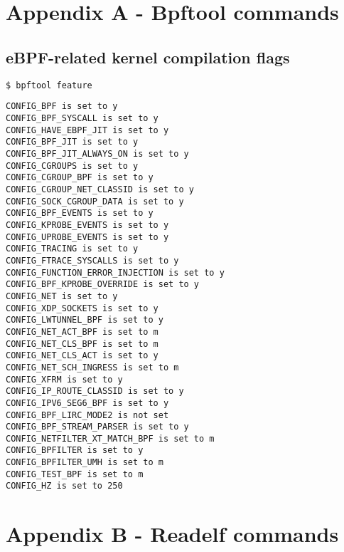 
%



\chapter* {Appendix A - Bpftool commands} \label{annex:bpftool_flags_kernel}
\section*{eBPF-related kernel compilation flags} 
\begin{lstlisting}[language=bash]
$ bpftool feature
\end{lstlisting}

\begin{verbatim}
CONFIG_BPF is set to y
CONFIG_BPF_SYSCALL is set to y
CONFIG_HAVE_EBPF_JIT is set to y
CONFIG_BPF_JIT is set to y
CONFIG_BPF_JIT_ALWAYS_ON is set to y
CONFIG_CGROUPS is set to y
CONFIG_CGROUP_BPF is set to y
CONFIG_CGROUP_NET_CLASSID is set to y
CONFIG_SOCK_CGROUP_DATA is set to y
CONFIG_BPF_EVENTS is set to y
CONFIG_KPROBE_EVENTS is set to y
CONFIG_UPROBE_EVENTS is set to y
CONFIG_TRACING is set to y
CONFIG_FTRACE_SYSCALLS is set to y
CONFIG_FUNCTION_ERROR_INJECTION is set to y
CONFIG_BPF_KPROBE_OVERRIDE is set to y
CONFIG_NET is set to y
CONFIG_XDP_SOCKETS is set to y
CONFIG_LWTUNNEL_BPF is set to y
CONFIG_NET_ACT_BPF is set to m
CONFIG_NET_CLS_BPF is set to m
CONFIG_NET_CLS_ACT is set to y
CONFIG_NET_SCH_INGRESS is set to m
CONFIG_XFRM is set to y
CONFIG_IP_ROUTE_CLASSID is set to y
CONFIG_IPV6_SEG6_BPF is set to y
CONFIG_BPF_LIRC_MODE2 is not set
CONFIG_BPF_STREAM_PARSER is set to y
CONFIG_NETFILTER_XT_MATCH_BPF is set to m
CONFIG_BPFILTER is set to y
CONFIG_BPFILTER_UMH is set to m
CONFIG_TEST_BPF is set to m
CONFIG_HZ is set to 250
\end{verbatim}


\chapter* {Appendix B - Readelf commands} \label{annex:readelf_commands}
